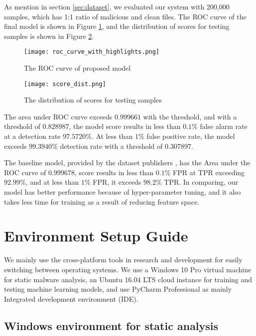 As mention in section \ref{sec:dataset}, we evaluated our system with 200,000 samples, which has 1:1 ratio of malicious and clean files. The ROC curve of the final model is shown in Figure \ref{fig:roc_curve_with_highlights}, and the distribution of scores for testing samples is shown in Figure \ref{fig:score_dist}.

\begin{figure}[h]
\centering
\texttt{[image: roc\_curve\_with\_highlights.png]}
\caption{The ROC curve of proposed model}
\label{fig:roc_curve_with_highlights}
\end{figure}

\begin{figure}[h] 
\centering
\texttt{[image: score\_dist.png]}
\caption{The distribution of scores for testing samples}
\label{fig:score_dist}
\end{figure}

The area under ROC curve exceeds $0.999661$ with the threshold, and with a threshold of $0.828987$, the model score results in less than $0.1\%$ false alarm rate at a detection rate $97.5720\%$. At less than $1\%$ false positive rate, the model exceeds $99.3940\%$ detection rate with a threshold of $0.307897$. 

The baseline model, provided by the dataset publishers \cite{anderson2018ember}, has the Area under the ROC curve of $0.999678$, score results in less than $0.1\%$ FPR at TPR exceeding $92.99\%$, and at less than $1\%$ FPR, it exceeds $98.2\%$ TPR. In comparing, our model has better performance because of hyper-parameter tuning, and it also takes less time for training as a result of reducing feature space. 

\section{Environment Setup Guide} 
\label{sec:research-env}

We mainly use the cross-platform tools in research and development for easily switching between operating systems. We use a Windows 10 Pro virtual machine for static malware analysis, an Ubuntu 16.04 LTS cloud instance for training and testing machine learning models, and use PyCharm Professional as mainly Integrated development environment (IDE).

\subsection{Windows environment for static analysis}

